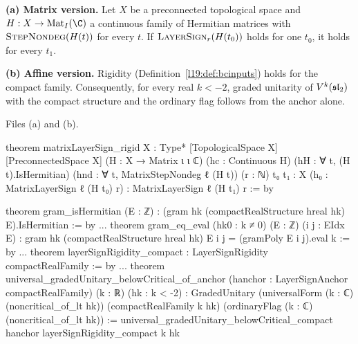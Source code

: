 \begin{theorem}\label{l19:thm:bcrigid}
\textbf{(a) Matrix version.} Let $X$ be a preconnected topological space and $H:X\to\mathrm{Mat}_I(\C)$ a continuous
family of Hermitian matrices with $\textsc{StepNondeg}(H(t))$ for every $t$. If $\textsc{LayerSign}_r(H(t_0))$ holds for one
$t_0$, it holds for every $t_1$.

\textbf{(b) Affine version.} Rigidity (Definition~\ref{l19:def:bcinputs}) holds for the compact family. Consequently, for
every real $k<-2$, graded unitarity of $V^k(\mathfrak{sl}_2)$ with the compact structure and the ordinary flag follows from
the anchor alone.
\end{theorem}

{\raggedright\noindent Files  (a) and
 (b).\par}
\begin{leancode}
theorem matrixLayerSign_rigid {X : Type*} [TopologicalSpace X] [PreconnectedSpace X]
    (H : X → Matrix ι ι ℂ) (hc : Continuous H) (hH : ∀ t, (H t).IsHermitian)
    (hnd : ∀ t, MatrixStepNondeg ℓ (H t)) (r : ℕ) {t₀ t₁ : X}
    (h₀ : MatrixLayerSign ℓ (H t₀) r) : MatrixLayerSign ℓ (H t₁) r := by

theorem gram_isHermitian (E : ℤ) : (gram hk (compactRealStructure hreal hk) E).IsHermitian := by
...
theorem gram_eq_eval (hk0 : k ≠ 0) (E : ℤ) (i j : EIdx E) :
    gram hk (compactRealStructure hreal hk) E i j = (gramPoly E i j).eval k := by
...
theorem layerSignRigidity_compact : LayerSignRigidity compactRealFamily := by
...
theorem universal_gradedUnitary_belowCritical_of_anchor
    (hanchor : LayerSignAnchor compactRealFamily) (k : ℝ) (hk : k < -2) :
    GradedUnitary (universalForm (k : ℂ) (noncritical_of_lt hk)) (compactRealFamily k hk)
      (ordinaryFlag (k : ℂ) (noncritical_of_lt hk)) :=
  universal_gradedUnitary_belowCritical_compact hanchor layerSignRigidity_compact k hk
\end{leancode}

